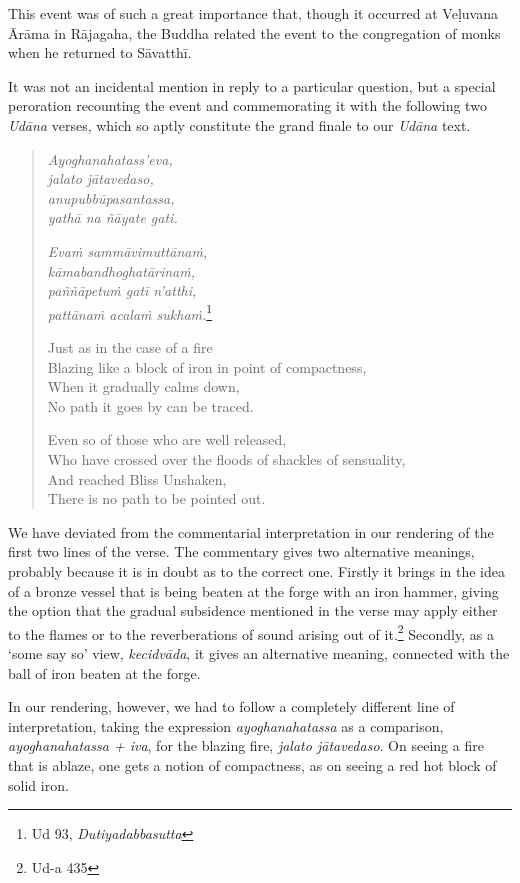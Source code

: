 This event was of such a great importance that, though it occurred at Veḷuvana Ārāma in Rājagaha, the Buddha related the event to the congregation of monks when he returned to Sāvatthī.

It was not an incidental mention in reply to a particular question, but a special peroration recounting the event and commemorating it with the following two \emph{Udāna} verses, which so aptly constitute the grand finale to our \emph{Udāna} text.

\begin{quote}
\emph{Ayoghanahatass'eva,}\\
\emph{jalato jātavedaso,}\\
\emph{anupubbūpasantassa,}\\
\emph{yathā na ñāyate gati.}

\emph{Evaṁ sammāvimuttānaṁ,}\\
\emph{kāmabandhoghatārinaṁ,}\\
\emph{paññāpetuṁ gatī n'atthi,}\\
\emph{pattānaṁ acalaṁ sukhaṁ.}\footnote{Ud 93, \emph{Dutiyadabbasutta}}

Just as in the case of a fire\\
Blazing like a block of iron in point of compactness,\\
When it gradually calms down,\\
No path it goes by can be traced.

Even so of those who are well released,\\
Who have crossed over the floods of shackles of sensuality,\\
And reached Bliss Unshaken,\\
There is no path to be pointed out.
\end{quote}

We have deviated from the commentarial interpretation in our rendering of the first two lines of the verse. The commentary gives two alternative meanings, probably because it is in doubt as to the correct one. Firstly it brings in the idea of a bronze vessel that is being beaten at the forge with an iron hammer, giving the option that the gradual subsidence mentioned in the verse may apply either to the flames or to the reverberations of sound arising out of it.\footnote{Ud-a 435} Secondly, as a `some say so' view, \emph{kecidvāda}, it gives an alternative meaning, connected with the ball of iron beaten at the forge.

In our rendering, however, we had to follow a completely different line of interpretation, taking the expression \emph{ayoghanahatassa} as a comparison, \emph{ayoghanahatassa + iva}, for the blazing fire, \emph{jalato jātavedaso}. On seeing a fire that is ablaze, one gets a notion of compactness, as on seeing a red hot block of solid iron.

